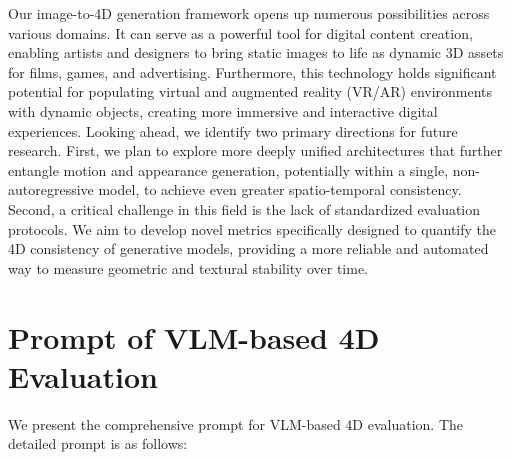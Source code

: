 Our image-to-4D generation framework opens up numerous possibilities across various domains. It can serve as a powerful tool for digital content creation, enabling artists and designers to bring static images to life as dynamic 3D assets for films, games, and advertising. Furthermore, this technology holds significant potential for populating virtual and augmented reality (VR/AR) environments with dynamic objects, creating more immersive and interactive digital experiences. Looking ahead, we identify two primary directions for future research. First, we plan to explore more deeply unified architectures that further entangle motion and appearance generation, potentially within a single, non-autoregressive model, to achieve even greater spatio-temporal consistency. Second, a critical challenge in this field is the lack of standardized evaluation protocols. We aim to develop novel metrics specifically designed to quantify the 4D consistency of generative models, providing a more reliable and automated way to measure geometric and textural stability over time.

\section{Prompt of VLM-based 4D Evaluation}
\label{sec:prompt}

We present the comprehensive prompt for VLM-based 4D evaluation. The detailed prompt is as follows:


